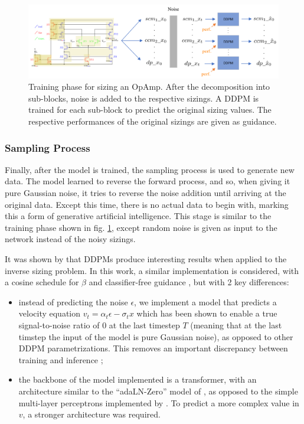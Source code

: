 \documentclass[conference]{IEEEtran}
\begin{document}
	\begin{figure}[h]
		\centering
		\includegraphics[width=\linewidth]{figures/DDPMSubBlockTraining}
		\setlength{\abovecaptionskip}{0ex}%
		\setlength{\belowcaptionskip}{-2ex}%
		\caption{Training phase for sizing an OpAmp. After the decomposition into sub-blocks, noise is added to the respective sizings. A DDPM is trained for each sub-block to predict the original sizing values. The respective performances of the original sizings are given as guidance.}
		\label{fig:DDPMtraining}
	\end{figure}
	
	\subsubsection{Sampling Process}
	Finally, after the model is trained, the sampling process is used to generate new data. The model learned to reverse the forward process, and so, when giving it pure Gaussian noise, it tries to reverse the noise addition until arriving at the original data. Except this time, there is no actual data to begin with, marking this a form of generative artificial intelligence. This stage is similar to the training phase shown in fig. \ref{fig:DDPMtraining}, except random noise is given as input to the network instead of the noisy sizings.
	
	It was shown by \cite{eid24diffusion} that DDPMs produce interesting results when applied to the inverse sizing problem. In this work, a similar implementation is considered, with a cosine schedule for $\beta$ and classifier-free guidance \cite{ho2022classifierfreediffusionguidance}, but with 2 key differences:
	
	\begin{itemize}
		\item instead of predicting the noise $\epsilon$, we implement a model that predicts a velocity equation $v_{t}=\alpha_{t}\epsilon - \sigma_{t}x$ which has been shown to enable a true signal-to-noise ratio of $0$ at the last timestep $T$ (meaning that at the last timstep the input of the model is pure Gaussian noise), as opposed to other DDPM parametrizations. This removes an important discrepancy between training and inference \cite{lin2024commondiffusionnoiseschedules};
		\item the backbone of the model implemented  is a transformer, with an architecture similar to the ``adaLN-Zero'' model of  \cite{peebles2023scalablediffusionmodelstransformers}, as opposed to the simple multi-layer perceptrons implemented by \cite{eid24diffusion}. To predict a more complex value in $v$, a stronger architecture was required.
	\end{itemize}
	
\end{document}
